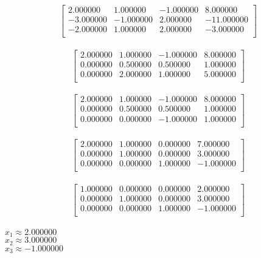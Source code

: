 \documentclass{article}
\begin{document}
\[
\left[
\begin{array}{ccc|c}
	2.000000&1.000000&-1.000000&8.000000\\
	-3.000000&-1.000000&2.000000&-11.000000\\
	-2.000000&1.000000&2.000000&-3.000000\\
\end{array}
\right]
\]
\\
\[
\left[
\begin{array}{ccc|c}
	2.000000&1.000000&-1.000000&8.000000\\
	0.000000&0.500000&0.500000&1.000000\\
	0.000000&2.000000&1.000000&5.000000\\
\end{array}
\right]
\]
\\
\[
\left[
\begin{array}{ccc|c}
	2.000000&1.000000&-1.000000&8.000000\\
	0.000000&0.500000&0.500000&1.000000\\
	0.000000&0.000000&-1.000000&1.000000\\
\end{array}
\right]
\]
\\
\[
\left[
\begin{array}{ccc|c}
	2.000000&1.000000&0.000000&7.000000\\
	0.000000&1.000000&0.000000&3.000000\\
	0.000000&0.000000&1.000000&-1.000000\\
\end{array}
\right]
\]
\\
\[
\left[
\begin{array}{ccc|c}
	1.000000&0.000000&0.000000&2.000000\\
	0.000000&1.000000&0.000000&3.000000\\
	0.000000&0.000000&1.000000&-1.000000\\
\end{array}
\right]
\]
\\
$x_{1} \approx 2.000000$\\
$x_{2} \approx 3.000000$\\
$x_{3} \approx -1.000000$\\
\end{document}
